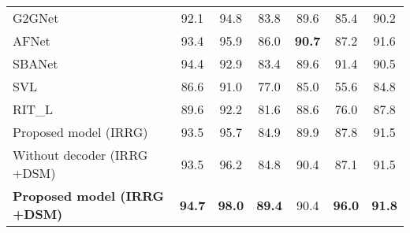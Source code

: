 \documentclass[journal]{IEEEtran}
\begin{document}
\begin{table*}[h!]
\begin{tabular}{lcccccc}
G2GNet \cite{9519842}                                 & 92.1                               & 94.8                         & 83.8                           & 89.6                     & 85.4                    & 90.2                                                     \\
AFNet \cite{9258402}                                  & 93.4                               & 95.9                         & 86.0                           & \textbf{90.7}            & 87.2                    & 91.6                                                     \\
SBANet \cite{9345482}                                 & 94.4                               & 92.9                         & 83.4                           & 89.6                     & 91.4                    & 90.5                                                     \\
SVL \cite{rs10091429}                                   & 86.6                               & 91.0                         & 77.0                           & 85.0                     & 55.6                    & 84.8                                                     \\
RIT\_L \cite{10.1117/12.2243169}                                 & 89.6                               & 92.2                         & 81.6                           & 88.6\textbf{}            & 76.0                    & 87.8                                                     \\

Proposed model (IRRG)                       & 93.5                               & 95.7                         & 84.9                           & 89.9                     & 87.8                    & 91.5                                                     \\
Without decoder (IRRG +DSM)                 & 93.5                               & 96.2                         & 84.8                           & 90.4                     & 87.1                    & 91.5                                                     \\
\textbf{Proposed model (IRRG +DSM)}         & \textbf{94.7}                      & \textbf{98.0}                & \textbf{89.4}                  & 90.4                     & \textbf{96.0}           & \textbf{91.8}   \\
\hline
\end{tabular}
\label{table:3}
\end{table*}
\end{document}
